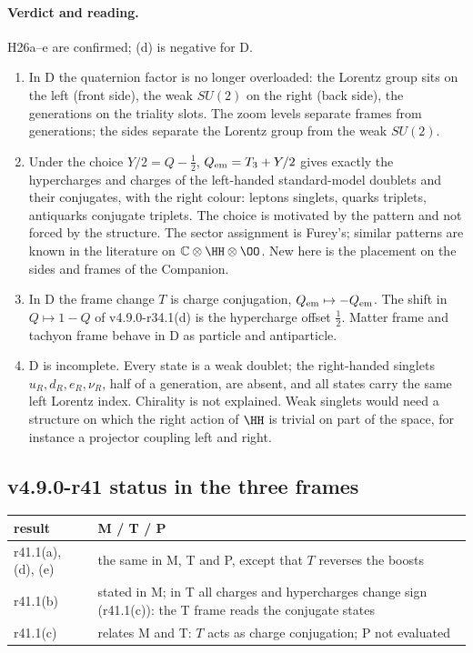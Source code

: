 \paragraph{Verdict and reading.}
H26a--e are confirmed; (d) is negative for D.
\begin{enumerate}[leftmargin=2em]
\item In D the quaternion factor is no longer overloaded: the Lorentz group sits on the left (front side), the weak \(SU(2)\) on the
right (back side), the generations on the triality slots.  The zoom levels separate frames from generations; the sides separate the
Lorentz group from the weak \(SU(2)\).
\item Under the choice \(Y/2=Q-\tfrac12\), \(Q_{\rm em}=T_3+Y/2\) gives exactly the hypercharges and charges of the left-handed
standard-model doublets and their conjugates, with the right colour: leptons singlets, quarks triplets, antiquarks conjugate
triplets.  The choice is motivated by the pattern and not forced by the structure.  The sector assignment is Furey's; similar patterns
are known in the literature on \(\mathbb C\otimes\HH\otimes\OO\).  New here is the placement on the sides and frames of the Companion.
\item In D the frame change \(T\) is charge conjugation, \(Q_{\rm em}\mapsto-Q_{\rm em}\).  The shift in \(Q\mapsto1-Q\) of v4.9.0-r34.1(d) is
the hypercharge offset \(\tfrac12\).  Matter frame and tachyon frame behave in D as particle and antiparticle.
\item D is incomplete.  Every state is a weak doublet; the right-handed singlets \(u_R,d_R,e_R,\nu_R\), half of a generation, are absent,
and all states carry the same left Lorentz index.  Chirality is not explained.  Weak singlets would need a structure on which the right
action of \(\HH\) is trivial on part of the space, for instance a projector coupling left and right.
\end{enumerate}

\subsection*{v4.9.0-r41 status in the three frames}
\label{subsec:v490-r41-frames}

\begin{center}
\small
\begin{tabular}{@{}>{\raggedright\arraybackslash}p{}>{\raggedright\arraybackslash}p{}@{}}
\toprule
result & M / T / P\\
\midrule
r41.1(a), (d), (e) & the same in M, T and P, except that \(T\) reverses the boosts\\
r41.1(b) & stated in M; in T all charges and hypercharges change sign (r41.1(c)): the T frame reads the conjugate states\\
r41.1(c) & relates M and T: \(T\) acts as charge conjugation; P not evaluated\\
\bottomrule
\end{tabular}
\end{center}

